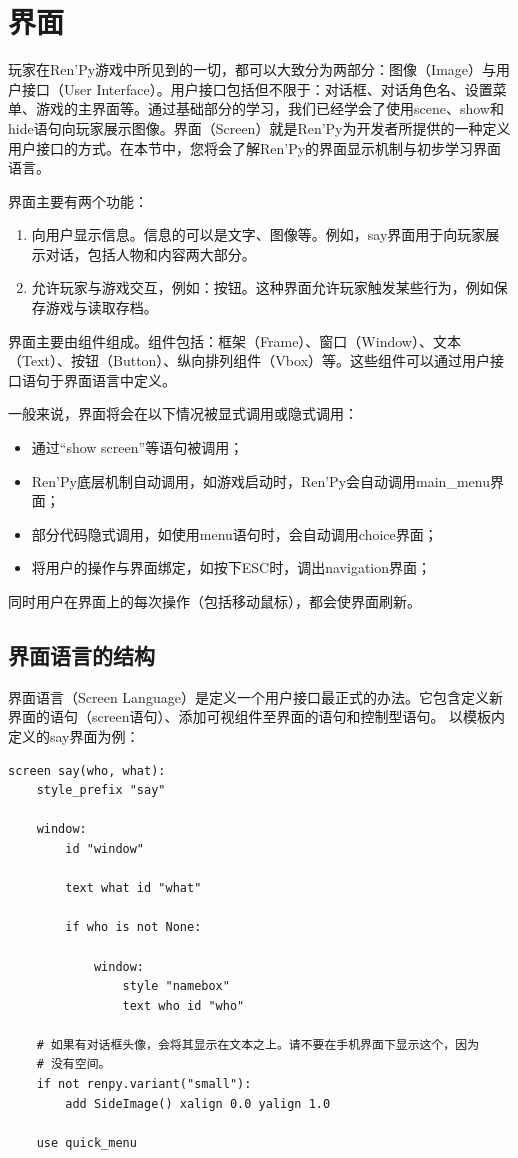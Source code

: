 \documentclass[../../Main.tex]{subfiles}
\begin{document}
\section{界面}
玩家在Ren'Py游戏中所见到的一切，都可以大致分为两部分：图像（Image）与用户接口（User Interface）。用户接口包括但不限于：对话框、对话角色名、设置菜单、游戏的主界面等。通过基础部分的学习，我们已经学会了使用scene、show和hide语句向玩家展示图像。界面（Screen）就是Ren'Py为开发者所提供的一种定义用户接口的方式。在本节中，您将会了解Ren'Py的界面显示机制与初步学习界面语言。

界面主要有两个功能：

\begin{enumerate}
    \item 向用户显示信息。信息的可以是文字、图像等。例如，say界面用于向玩家展示对话，包括人物和内容两大部分。
    \item 允许玩家与游戏交互，例如：按钮。这种界面允许玩家触发某些行为，例如保存游戏与读取存档。
\end{enumerate}

界面主要由组件组成。组件包括：框架（Frame）、窗口（Window）、文本（Text）、按钮（Button）、纵向排列组件（Vbox）等。这些组件可以通过用户接口语句于界面语言中定义。

一般来说，界面将会在以下情况被显式调用或隐式调用：

\begin{itemize}
    \item 通过“show screen”等语句被调用；
    \item Ren'Py底层机制自动调用，如游戏启动时，Ren'Py会自动调用main\_menu界面；
    \item 部分代码隐式调用，如使用menu语句时，会自动调用choice界面；
    \item 将用户的操作与界面绑定，如按下ESC时，调出navigation界面；
\end{itemize}

同时用户在界面上的每次操作（包括移动鼠标），都会使界面刷新。
\subsection{界面语言的结构}
界面语言（Screen Language）是定义一个用户接口最正式的办法。它包含定义新界面的语句（screen语句）、添加可视组件至界面的语句和控制型语句。
以模板内定义的say界面为例：
\begin{lstlisting}
screen say(who, what):
    style_prefix "say"

    window:
        id "window"

        text what id "what"

        if who is not None:

            window:
                style "namebox"
                text who id "who"

    # 如果有对话框头像，会将其显示在文本之上。请不要在手机界面下显示这个，因为
    # 没有空间。
    if not renpy.variant("small"):
        add SideImage() xalign 0.0 yalign 1.0

    use quick_menu
\end{lstlisting}
\end{document}
